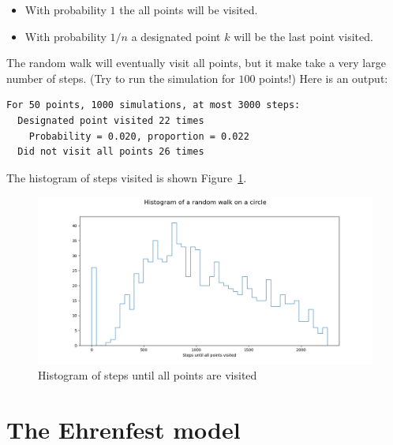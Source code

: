 \documentclass[11pt,a4paper]{article}
\begin{document}
\begin{itemize}
\item With probability $1$ the all points will be visited.
\item With probability $1/n$ a designated point $k$ will be the last point visited.
\end{itemize}

The random walk will eventually visit all points, but it make take a very large number of steps. (Try to run the simulation for $100$ points!) Here is an output:
\begin{verbatim}
For 50 points, 1000 simulations, at most 3000 steps:
  Designated point visited 22 times
    Probability = 0.020, proportion = 0.022
  Did not visit all points 26 times
\end{verbatim}
The histogram of steps visited is shown Figure~\ref{f.random-walk-circle-histogram}. 
\begin{figure}
\begin{center}
\includegraphics[width=\textwidth]{random-walk-circle}
\caption{Histogram of steps until all points are visited}\label{f.random-walk-circle-histogram}
\end{center}
\end{figure}



\section{The Ehrenfest model}\label{s.ehrenfest}
\end{document}
